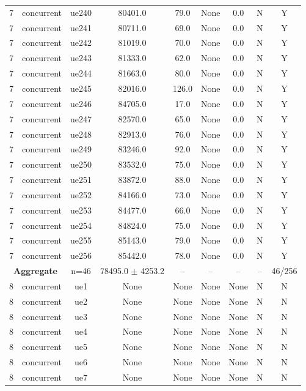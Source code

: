 \begin{table}[ht]
\begin{tabular}{|c|c|c|c|c|c|c|c|c|}
7 & concurrent & ue240 & 80401.0 & 79.0 & None & 0.0 & N & Y \\
7 & concurrent & ue241 & 80711.0 & 69.0 & None & 0.0 & N & Y \\
7 & concurrent & ue242 & 81019.0 & 70.0 & None & 0.0 & N & Y \\
7 & concurrent & ue243 & 81333.0 & 62.0 & None & 0.0 & N & Y \\
7 & concurrent & ue244 & 81663.0 & 80.0 & None & 0.0 & N & Y \\
7 & concurrent & ue245 & 82016.0 & 126.0 & None & 0.0 & N & Y \\
7 & concurrent & ue246 & 84705.0 & 17.0 & None & 0.0 & N & Y \\
7 & concurrent & ue247 & 82570.0 & 65.0 & None & 0.0 & N & Y \\
7 & concurrent & ue248 & 82913.0 & 76.0 & None & 0.0 & N & Y \\
7 & concurrent & ue249 & 83246.0 & 92.0 & None & 0.0 & N & Y \\
7 & concurrent & ue250 & 83532.0 & 75.0 & None & 0.0 & N & Y \\
7 & concurrent & ue251 & 83872.0 & 88.0 & None & 0.0 & N & Y \\
7 & concurrent & ue252 & 84166.0 & 73.0 & None & 0.0 & N & Y \\
7 & concurrent & ue253 & 84477.0 & 66.0 & None & 0.0 & N & Y \\
7 & concurrent & ue254 & 84824.0 & 75.0 & None & 0.0 & N & Y \\
7 & concurrent & ue255 & 85143.0 & 79.0 & None & 0.0 & N & Y \\
7 & concurrent & ue256 & 85442.0 & 78.0 & None & 0.0 & N & Y \\
\multicolumn{2}{|c|}{\textbf{Aggregate}} & n=46 & 78495.0 $\pm$ 4253.2 & -- & -- & -- & -- & 46/256 \\
\hline
8 & concurrent & ue1 & None & None & None & None & N & N \\
8 & concurrent & ue2 & None & None & None & None & N & N \\
8 & concurrent & ue3 & None & None & None & None & N & N \\
8 & concurrent & ue4 & None & None & None & None & N & N \\
8 & concurrent & ue5 & None & None & None & None & N & N \\
8 & concurrent & ue6 & None & None & None & None & N & N \\
8 & concurrent & ue7 & None & None & None & None & N & N \\

\end{tabular}
\end{table}
